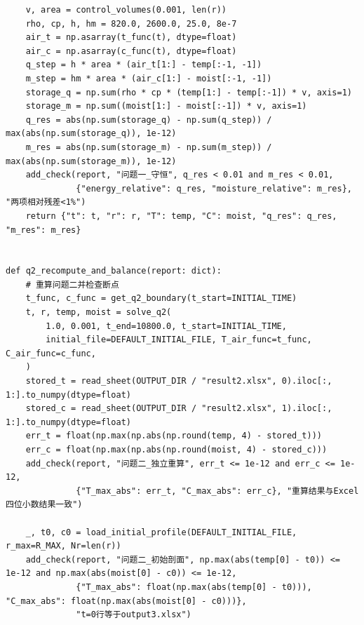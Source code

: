 \documentclass[withoutpreface,bwprint]{cumcm_thesis}
\begin{document}
\begin{appendices}
\begin{lstlisting}
    v, area = control_volumes(0.001, len(r))
    rho, cp, h, hm = 820.0, 2600.0, 25.0, 8e-7
    air_t = np.asarray(t_func(t), dtype=float)
    air_c = np.asarray(c_func(t), dtype=float)
    q_step = h * area * (air_t[1:] - temp[:-1, -1])
    m_step = hm * area * (air_c[1:] - moist[:-1, -1])
    storage_q = np.sum(rho * cp * (temp[1:] - temp[:-1]) * v, axis=1)
    storage_m = np.sum((moist[1:] - moist[:-1]) * v, axis=1)
    q_res = abs(np.sum(storage_q) - np.sum(q_step)) / max(abs(np.sum(storage_q)), 1e-12)
    m_res = abs(np.sum(storage_m) - np.sum(m_step)) / max(abs(np.sum(storage_m)), 1e-12)
    add_check(report, "问题一_守恒", q_res < 0.01 and m_res < 0.01,
              {"energy_relative": q_res, "moisture_relative": m_res}, "两项相对残差<1%")
    return {"t": t, "r": r, "T": temp, "C": moist, "q_res": q_res, "m_res": m_res}


def q2_recompute_and_balance(report: dict):
    # 重算问题二并检查断点
    t_func, c_func = get_q2_boundary(t_start=INITIAL_TIME)
    t, r, temp, moist = solve_q2(
        1.0, 0.001, t_end=10800.0, t_start=INITIAL_TIME,
        initial_file=DEFAULT_INITIAL_FILE, T_air_func=t_func, C_air_func=c_func,
    )
    stored_t = read_sheet(OUTPUT_DIR / "result2.xlsx", 0).iloc[:, 1:].to_numpy(dtype=float)
    stored_c = read_sheet(OUTPUT_DIR / "result2.xlsx", 1).iloc[:, 1:].to_numpy(dtype=float)
    err_t = float(np.max(np.abs(np.round(temp, 4) - stored_t)))
    err_c = float(np.max(np.abs(np.round(moist, 4) - stored_c)))
    add_check(report, "问题二_独立重算", err_t <= 1e-12 and err_c <= 1e-12,
              {"T_max_abs": err_t, "C_max_abs": err_c}, "重算结果与Excel四位小数结果一致")

    _, t0, c0 = load_initial_profile(DEFAULT_INITIAL_FILE, r_max=R_MAX, Nr=len(r))
    add_check(report, "问题二_初始剖面", np.max(abs(temp[0] - t0)) <= 1e-12 and np.max(abs(moist[0] - c0)) <= 1e-12,
              {"T_max_abs": float(np.max(abs(temp[0] - t0))), "C_max_abs": float(np.max(abs(moist[0] - c0)))},
              "t=0行等于output3.xlsx")


\end{lstlisting}
\end{appendices}
\end{document}
